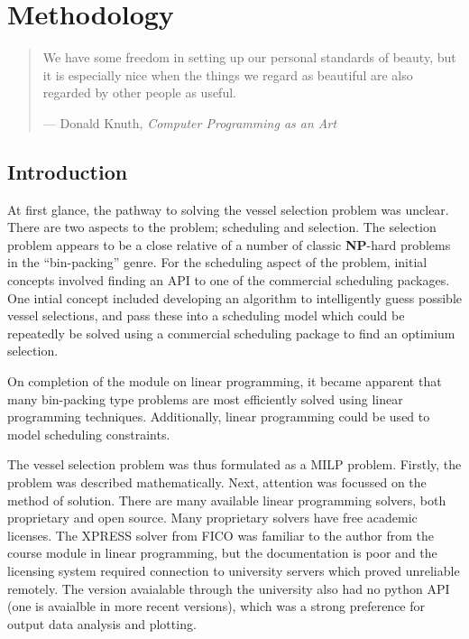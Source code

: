 %
%
%
%

\chapter{Methodology}\label{C.methodology}

\begin{quote}
We have some freedom in setting up our personal standards of beauty, but it is
especially nice when the things we regard as beautiful are also regarded by
other people as useful.

\hspace{2cm}--- Donald Knuth, \emph{Computer Programming as an Art}
\end{quote}

\section{Introduction}\label{S.intro4}

At first glance, the pathway to solving the vessel selection problem was
unclear.
There are two aspects to the problem; scheduling and selection.
The selection problem appears to be a close relative of a number of classic
\textbf{NP}-hard problems in the ``bin-packing'' genre.
For the scheduling aspect of the problem, initial concepts involved finding an
API to one of the commercial scheduling packages.
One intial concept included developing an algorithm to intelligently guess
possible vessel selections, and pass these into a scheduling model which
could be repeatedly be solved using a commercial scheduling package
to find an optimium selection.

On completion of the module on linear programming, it became apparent that
many bin-packing type problems are most efficiently solved using linear
programming techniques.
Additionally, linear programming could be used to model scheduling constraints.

The vessel selection problem was thus formulated as a MILP problem.
Firstly, the problem was described mathematically.
Next, attention was focussed on the method of solution.
There are many available linear programming solvers, both proprietary and open
source.
Many proprietary solvers have free academic licenses.
The XPRESS solver from FICO was familiar to the author from the course module
in linear programming, but the documentation is poor and the licensing system
required connection to university servers which proved unreliable remotely.
The version avaialable through the university also had no python API (one is
avaialble in more recent versions), which was a strong preference for output
data analysis and plotting.

